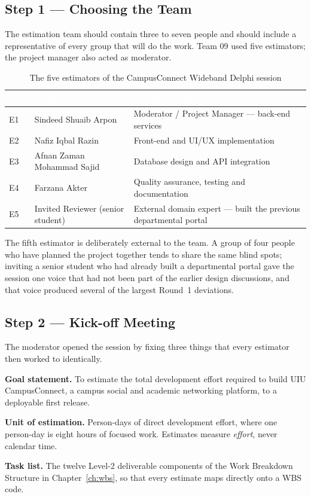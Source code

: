 \documentclass[11pt,a4paper]{report}
\newcommand{\thead}[1]{\textcolor{white}{\sffamily\bfseries #1}}
\newcommand{\rowhead}{\rowcolor{headRow}}
\begin{document}
\subsection{Step 1 --- Choosing the Team}

The estimation team should contain three to seven people and should include a
representative of every group that will do the work. Team 09 used five
estimators; the project manager also acted as moderator.


\begin{table}[htbp]
\centering
\caption{The five estimators of the CampusConnect Wideband Delphi session}
\label{tab:experts}
\begin{tabular}{|C{1.1cm}|L{5.0cm}|L{8.0cm}|}
\hline
\rowhead \thead{Ref.} & \thead{Estimator} & \thead{Perspective Represented} \\ \hline
E1 & Sindeed Shuaib Arpon & Moderator / Project Manager --- back-end services \\ \hline
{}
E2 & Nafiz Iqbal Razin & Front-end and UI/UX implementation \\ \hline
E3 & Afnan Zaman Mohammad Sajid & Database design and API integration \\ \hline
{}
E4 & Farzana Akter & Quality assurance, testing and documentation \\ \hline
E5 & Invited Reviewer (senior student) & External domain expert --- built the previous departmental portal \\ \hline
\end{tabular}
\end{table}

The fifth estimator is deliberately external to the team. A group of four people
who have planned the project together tends to share the same blind spots;
inviting a senior student who had already built a departmental portal gave the
session one voice that had not been part of the earlier design discussions, and
that voice produced several of the largest Round~1 deviations.

\subsection{Step 2 --- Kick-off Meeting}

The moderator opened the session by fixing three things that every estimator then
worked to identically.

\begin{keybox}
\textbf{Goal statement.} To estimate the total development effort required to
build UIU CampusConnect, a campus social and academic networking platform, to a
deployable first release.

\medskip
\textbf{Unit of estimation.} Person-days of direct development effort, where one
person-day is eight hours of focused work. Estimates measure \emph{effort}, never
calendar time.

\medskip
\textbf{Task list.} The twelve Level-2 deliverable components of the Work
Breakdown Structure in Chapter~\ref{ch:wbs}, so that every estimate maps directly
onto a WBS code.
\end{keybox}
\end{document}
